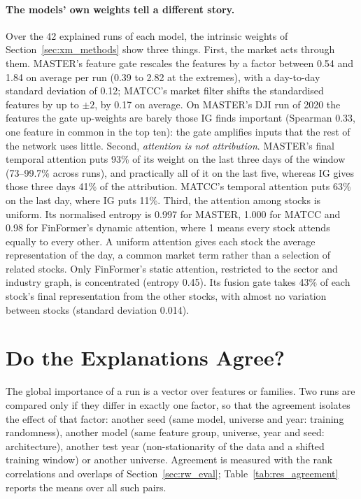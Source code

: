 \paragraph{The models' own weights tell a different story.} Over the 42 explained runs of each model, the intrinsic weights of Section~\ref{sec:xm_methods} show three things. First, the market acts through them. MASTER's feature gate rescales the features by a factor between 0.54 and 1.84 on average per run (0.39 to 2.82 at the extremes), with a day-to-day standard deviation of 0.12; MATCC's market filter shifts the standardised features by up to $\pm 2$, by 0.17 on average. On MASTER's DJI run of 2020 the features the gate up-weights are barely those IG finds important (Spearman 0.33, one feature in common in the top ten): the gate amplifies inputs that the rest of the network uses little. Second, \emph{attention is not attribution}. MASTER's final temporal attention puts 93\% of its weight on the last three days of the window (73--99.7\% across runs), and practically all of it on the last five, whereas IG gives those three days 41\% of the attribution. MATCC's temporal attention puts 63\% on the last day, where IG puts 11\%. Third, the attention among stocks is uniform. Its normalised entropy is 0.997 for MASTER, 1.000 for MATCC and 0.98 for FinFormer's dynamic attention, where 1 means every stock attends equally to every other. A uniform attention gives each stock the average representation of the day, a common market term rather than a selection of related stocks. Only FinFormer's static attention, restricted to the sector and industry graph, is concentrated (entropy 0.45). Its fusion gate takes 43\% of each stock's final representation from the other stocks, with almost no variation between stocks (standard deviation 0.014).


\section{Do the Explanations Agree?}
\label{sec:res_agreement}

The global importance of a run is a vector over features or families. Two runs are compared only if they differ in exactly one factor, so that the agreement isolates the effect of that factor: another seed (same model, universe and year: training randomness), another model (same feature group, universe, year and seed: architecture), another test year (non-stationarity of the data and a shifted training window) or another universe. Agreement is measured with the rank correlations and overlaps of Section~\ref{sec:rw_eval}; Table~\ref{tab:res_agreement} reports the means over all such pairs.

